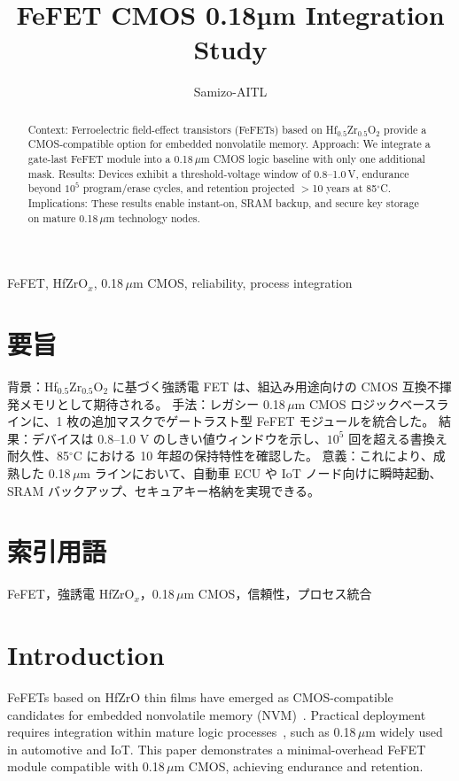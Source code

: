 \documentclass[journal]{IEEEtran}
\begin{document}
\title{FeFET CMOS 0.18µm Integration Study}
\author{Samizo-AITL}
\maketitle

\begin{abstract}
Context: Ferroelectric field-effect transistors (FeFETs) based on Hf$_{0.5}$Zr$_{0.5}$O$_2$ provide a CMOS-compatible option for embedded nonvolatile memory.  
Approach: We integrate a gate-last FeFET module into a 0.18\,$\mu$m CMOS logic baseline with only one additional mask.  
Results: Devices exhibit a threshold-voltage window of 0.8--1.0\,V, endurance beyond $10^5$ program/erase cycles, and retention projected $>$10 years at 85$^\circ$C.  
Implications: These results enable instant-on, SRAM backup, and secure key storage on mature 0.18\,$\mu$m technology nodes.
\end{abstract}

\begin{IEEEkeywords}
FeFET, HfZrO$_x$, 0.18\,$\mu$m CMOS, reliability, process integration
\end{IEEEkeywords}

\section*{要旨}
背景：Hf$_{0.5}$Zr$_{0.5}$O$_2$ に基づく強誘電 FET は、組込み用途向けの CMOS 互換不揮発メモリとして期待される。  
手法：レガシー 0.18\,$\mu$m CMOS ロジックベースラインに、1 枚の追加マスクでゲートラスト型 FeFET モジュールを統合した。  
結果：デバイスは 0.8--1.0 V のしきい値ウィンドウを示し、$10^5$ 回を超える書換え耐久性、85$^\circ$C における 10 年超の保持特性を確認した。  
意義：これにより、成熟した 0.18\,$\mu$m ラインにおいて、自動車 ECU や IoT ノード向けに瞬時起動、SRAM バックアップ、セキュアキー格納を実現できる。

\section*{索引用語}
FeFET，強誘電 HfZrO$_x$，0.18\,$\mu$m CMOS，信頼性，プロセス統合

\section{Introduction}
FeFETs based on HfZrO thin films have emerged as CMOS-compatible candidates for embedded nonvolatile memory (NVM)~\cite{boscke2011hafnium,mueller2012fefet}. Practical deployment requires integration within mature logic processes~\cite{mitsubishi2003automotive}, such as 0.18\,$\mu$m widely used in automotive and IoT.  
This paper demonstrates a minimal-overhead FeFET module compatible with 0.18\,$\mu$m CMOS, achieving endurance and retention.
\end{document}
